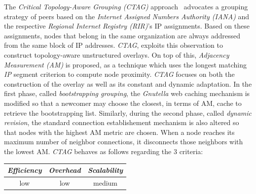 The \emph{Critical Topology-Aware Grouping (CTAG)} approach~\cite{ZL2006}
advocates a grouping strategy of peers based on the 
\emph{Internet Assigned Numbers Authority (IANA)} and 
the respective \emph{Regional Internet Registry (RIR)}'s IP assignments.
Based on these assignments, nodes that belong in the same 
organization are always addressed from the same block of IP addresses.
\emph{CTAG}, exploits this observation to construct topology-aware unstructured
overlays. On top of this, \emph{Adjacency Measurement (AM)} is proposed, as
a technique which uses the longest matching \emph{IP} segment criterion to
compute node proximity. \emph{CTAG} focuses on both the construction of the
overlay as well as its constant and dynamic adaptation.
In the first phase,
called \emph{bootstrapping grouping},
the {\sl Gnutella} web caching mechanism
is modified so that a newcomer may choose the closest, in terms of AM,
cache to retrieve the bootstrapping list. Similarly, during the second phase,
called \emph{dynamic revision}, the standard connection establishement mechanism
is also altered so that nodes with the highest AM metric are chosen. When a node
reaches its maximum number of neighbor
connections, it disconnects those neighbors with the lowest AM.
\emph{CTAG} behaves as follows regarding the $3$ criteria:
\begin{center}
{\footnotesize
\begin{tabular}{ccc}
\emph{Efficiency} & \emph{Overhead} & \emph{Scalability} \\
\hline
low &
low &
medium
\end{tabular}
}
\end{center}



